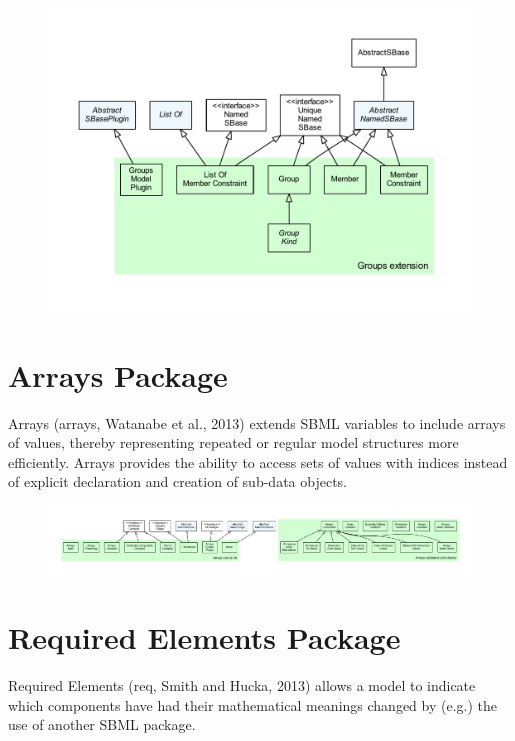 \begin{figure}[hb]
 \centering
 \vspace*{2ex}
 \includegraphics[width=\textwidth]{../../../extensions/groups/doc/img/type_hierarchy.pdf}
 \caption[The groups extension]{}
 \label{fig:groups}
\end{figure}


\section{Arrays Package}
\label{sec:arrays-overview}
Arrays (arrays, Watanabe et al., 2013) extends SBML variables to include arrays of values,
thereby representing repeated or regular model structures more efficiently.
Arrays provides the ability to access sets of values with indices instead of explicit
declaration and creation of sub-data objects.

\begin{figure}[hb]
 \centering
 \vspace*{2ex}
 \includegraphics[width=\textwidth]{../../../extensions/arrays/doc/img/type_hierarchy.pdf}
 \caption[The arrays extension]{}
 \label{fig:arrays}
\end{figure}

\section{Required Elements Package}
\label{sec:req-overview}
Required Elements (req, Smith and Hucka, 2013) allows a model to indicate which
components have had their mathematical meanings changed by (e.g.) the use of
another SBML package.


